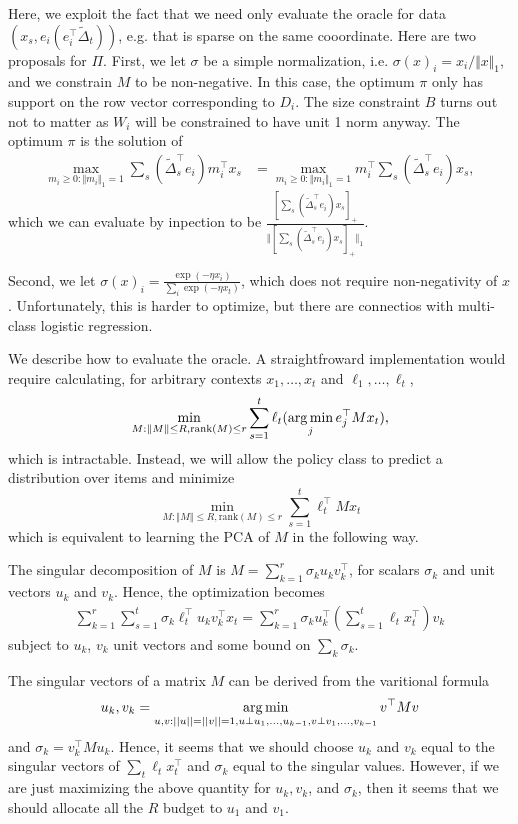 \documentclass[11pt]{article}
\newcommand{\rank}{\mathrm{rank}}
\begin{document}
Here, we exploit the fact that we need only evaluate the oracle for data $(x_s, e_i (e_i^\top \tilde\Delta_t))$, e.g. that is sparse on the same cooordinate. Here are two proposals for $\Pi$. First, we let $\sigma$ be a simple normalization, i.e. $\sigma(x)_i = x_i / \Vert x \Vert_1$, and we constrain $M$ to be non-negative. In this case, the optimum $\pi$ only has support on the row vector corresponding to $D_i$. The size constraint $B$ turns out not to matter as $W_i$ will be constrained to have unit 1 norm anyway. The optimum $\pi$ is the solution of
\begin{align*}
    \max_{m_i\geq 0:\Vert m_i\Vert_1 = 1} \sum_s (\tilde\Delta_s^\top e_i) m_i^\top x_s
  &=
    \max_{m_i\geq 0:\Vert m_i\Vert_1 = 1} m_i^\top \sum_s (\tilde\Delta_s^\top e_i)x_s,
\end{align*}
which we can evaluate by inpection to be $\frac{[\sum_s (\tilde\Delta_s^\top e_i)x_s]_+}{\Vert [\sum_s (\tilde\Delta_s^\top e_i)x_s]_+\Vert_1}$.


Second, we let $\sigma(x)_i = \frac{\exp(-\eta x_i)}{ \sum_i \exp(-\eta x_t)}$, which does not require non-negativity of $x$. Unfortunately, this is harder to optimize, but there are connectios with multi-class logistic regression.

We describe how to evaluate the oracle. A straightfroward implementation would require calculating, for arbitrary contexts $x_1,\ldots,x_t$ and $\ell_1,\ldots,\ell_t$,
\[
  \min_{M: \Vert M \Vert \leq R, \rank(M) \leq r} \sum_{s=1}^t \ell_t (\argmin_j e_j^\top M x_t),
\]
which is intractable. Instead, we will allow the policy class to predict a distribution over items and minimize
\[
  \min_{M: \Vert M \Vert \leq R, \rank(M) \leq r} \sum_{s=1}^t \ell_t^\top M x_t
\]
which is equivalent to learning the PCA of $M$ in the following way.

The singular decomposition of $M$ is $M = \sum_{k=1}^r \sigma_k u_k v_k^\top$, for scalars $\sigma_k$ and unit vectors $u_k$ and $v_k$. Hence, the optimization becomes
\begin{align*}
  \sum_{k=1}^r\sum_{s=1}^t \sigma_k \ell_t^\top u_k v_k^\top x_t
  =
  \sum_{k=1}^r \sigma_k u^\top_k \left( \sum_{s=1}^t \ell_t x_t^\top\right) v_k
\end{align*}
subject to $u_k$, $v_k$ unit vectors and some bound on $\sum_k \sigma_k$.


The singular vectors of a matrix $M$ can be derived from the varitional formula
\[
  u_k, v_k = \operatorname*{arg\,min}_{u, v: ||u|| = ||v|| = 1, u\perp u_1,\ldots,u_{k-1}, v\perp v_1,\ldots,v_{k-1}} v^\top M v
  \]
  and $\sigma_k = v_k^\top M u_k$. Hence, it seems that we should choose $u_k$ and $v_k$ equal to the singular vectors of $\sum_t \ell_t x_t^\top$ and $\sigma_k$ equal to the singular values. However, if we are just maximizing the above quantity for $u_k,v_k$, and $\sigma_k$, then it seems that we should allocate all the $R$ budget to $u_1$ and $v_1$.
\end{document}
